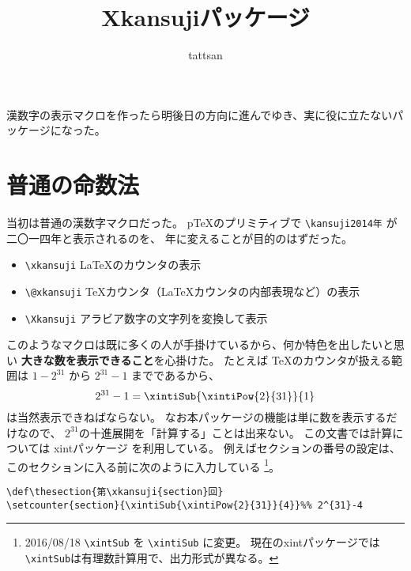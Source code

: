 \documentclass[dvipdfmx]{jsarticle}
\title{\textsf{Xkansujiパッケージ}}
\author{tattsan}
\date{}
\begin{document}
\maketitle
漢数字の表示マクロを作ったら明後日の方向に進んでゆき、実に役に立たないパッケージになった。
\def\thesection{第\xkansuji{section}話}
\section{普通の命数法}
当初は普通の漢数字マクロだった。
p\TeX\space のプリミティブで \verb+\kansuji2014年+ が二〇一四年と表示されるのを、
年に変えることが目的のはずだった。
\begin{screen}
\begin{itemize}
\item \verb+\xkansuji+ \LaTeX のカウンタの表示
\item \verb+\@xkansuji+ \TeX カウンタ（\LaTeX カウンタの内部表現など）の表示
\item \verb+\Xkansuji+ アラビア数字の文字列を変換して表示
\end{itemize}  
\end{screen}
このようなマクロは既に多くの人が手掛けているから、何か特色を出したいと思い
\textbf{大きな数を表示できること}を心掛けた。
たとえば \TeX のカウンタが扱える範囲は $1-2^{31}$ から $2^{31}-1$ までであるから、
\[
2^{31}-1=\xintiSub{\xintiPow{2}{31}}{1}
\]
は当然表示できねばならない。
なお本パッケージの機能は単に数を表示するだけなので、
$2^{31}$の十進展開を「計算する」ことは出来ない。
この文書では計算については \textsf{xintパッケージ} を利用している。
例えばセクションの番号の設定は、このセクションに入る前に次のように入力している
\footnote{%
2016/08/18 \texttt{\textbackslash xintSub} を \texttt{\textbackslash xintiSub} に変更。
現在の\textsf{xintパッケージ}では\texttt{\textbackslash xintSub}は有理数計算用で、出力形式が異なる。}。
\begin{verbatim}
\def\thesection{第\xkansuji{section}回}
\setcounter{section}{\xintiSub{\xintiPow{2}{31}}{4}}%% 2^{31}-4
\end{verbatim}
\end{document}
